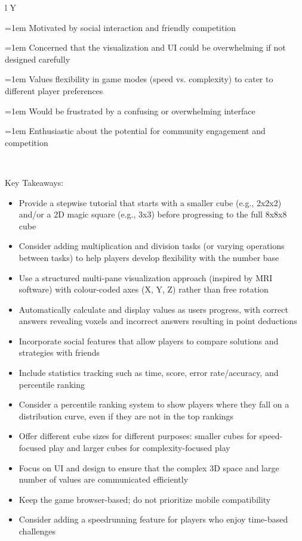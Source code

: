 \documentclass{article}
\newcommand{\cellbullet}{\par\noindent\hangindent=1em\hangafter=1%
  \makebox[1em][l]{\textbullet}\ignorespaces}
\newenvironment{empathylist}
  {\begin{minipage}[t]{\linewidth}\let\item\cellbullet}
  {\strut\end{minipage}}
\begin{document}
\begin{tabularx}{\textwidth}{l Y}
\begin{empathylist}
  \item Motivated by social interaction and friendly competition
  \item Concerned that the visualization and UI could be overwhelming if not designed carefully
  \item Values flexibility in game modes (speed vs. complexity) to cater to different player preferences
  \item Would be frustrated by a confusing or overwhelming interface
  \item Enthusiastic about the potential for community engagement and competition
\end{empathylist} \\
\end{tabularx}

Key Takeaways:

\begin{itemize}
\item Provide a stepwise tutorial that starts with a smaller cube (e.g., 2x2x2) and/or a 2D magic square (e.g., 3x3) before progressing to the full 8x8x8 cube
\item Consider adding multiplication and division tasks (or varying operations between tasks) to help players develop flexibility with the number base
\item Use a structured multi-pane visualization approach (inspired by MRI software) with colour-coded axes (X, Y, Z) rather than free rotation
\item Automatically calculate and display values as users progress, with correct answers revealing voxels and incorrect answers resulting in point deductions
\item Incorporate social features that allow players to compare solutions and strategies with friends
\item Include statistics tracking such as time, score, error rate/accuracy, and percentile ranking
\item Consider a percentile ranking system to show players where they fall on a distribution curve, even if they are not in the top rankings
\item Offer different cube sizes for different purposes: smaller cubes for speed-focused play and larger cubes for complexity-focused play
\item Focus on UI and design to ensure that the complex 3D space and large number of values are communicated efficiently
\item Keep the game browser-based; do not prioritize mobile compatibility
\item Consider adding a speedrunning feature for players who enjoy time-based challenges
\end{itemize}
\end{document}
